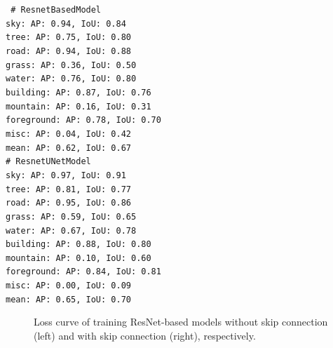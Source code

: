 \documentclass[11pt]{article}
\begin{document}

{\centering \tt \small
\# ResnetBasedModel \\
sky: AP: 0.94, IoU: 0.84 \\
tree: AP: 0.75, IoU: 0.80 \\
road: AP: 0.94, IoU: 0.88 \\
grass: AP: 0.36, IoU: 0.50 \\
water: AP: 0.76, IoU: 0.80 \\
building: AP: 0.87, IoU: 0.76 \\
mountain: AP: 0.16, IoU: 0.31 \\
foreground: AP: 0.78, IoU: 0.70 \\
misc: AP: 0.04, IoU: 0.42 \\
mean: AP: 0.62, IoU: 0.67 \\

\# ResnetUNetModel \\
sky: AP: 0.97, IoU: 0.91 \\
tree: AP: 0.81, IoU: 0.77 \\
road: AP: 0.95, IoU: 0.86 \\
grass: AP: 0.59, IoU: 0.65 \\
water: AP: 0.67, IoU: 0.78 \\
building: AP: 0.88, IoU: 0.80 \\
mountain: AP: 0.10, IoU: 0.60 \\
foreground: AP: 0.84, IoU: 0.81 \\
misc: AP: 0.00, IoU: 0.09 \\
mean: AP: 0.65, IoU: 0.70 \\
}

\begin{figure}[h]
    \centering
    \qquad
    \caption{Loss curve of training ResNet-based models without skip connection (left) and with skip connection (right), respectively.}
    \label{fig:loss-ResnetBasedModel]}
\end{figure}
\end{document}
